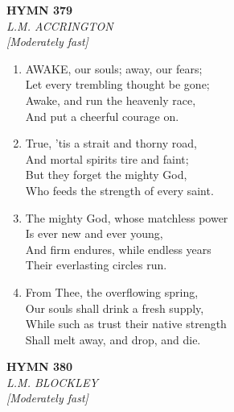 \documentclass[11pt,a4paper]{article}
\begin{document}
\newpage
\begin{center}
    {\Large \textbf{HYMN 379}}
    \\
    \textit{L.M. ACCRINGTON}
    \\
    \textit{\small [Moderately fast]}
\end{center}
\vspace{1em}

\begin{enumerate}
    \item AWAKE, our souls; away, our fears; \\
        Let every trembling thought be gone; \\
        Awake, and run the heavenly race, \\
        And put a cheerful courage on.

    \item True, 'tis a strait and thorny road, \\
        And mortal spirits tire and faint; \\
        But they forget the mighty God, \\
        Who feeds the strength of every saint.

    \item The mighty God, whose matchless power \\
        Is ever new and ever young, \\
        And firm endures, while endless years \\
        Their everlasting circles run.

    \item From Thee, the overflowing spring, \\
        Our souls shall drink a fresh supply, \\
        While such as trust their native strength \\
        Shall melt away, and drop, and die.

\end{enumerate}

\newpage
\begin{center}
    {\Large \textbf{HYMN 380}}
    \\
    \textit{L.M. BLOCKLEY}
    \\
    \textit{\small [Moderately fast]}
\end{center}
\vspace{1em}
\end{document}
